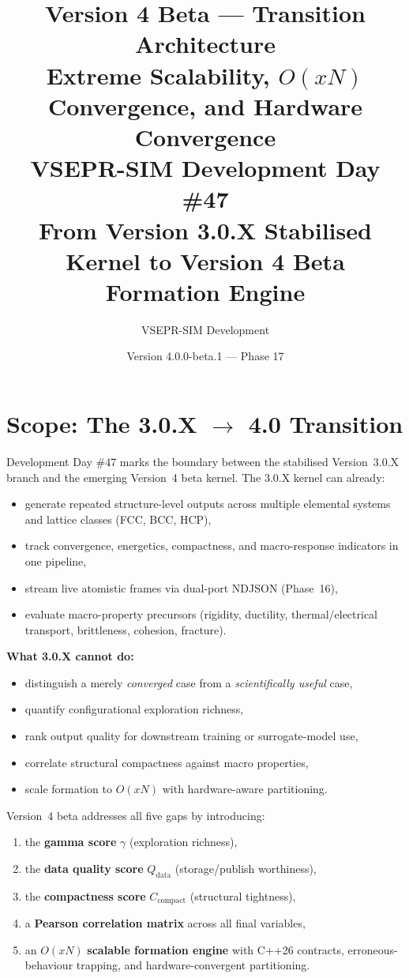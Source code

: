 \documentclass[11pt]{article}
\title{\textbf{Version 4 Beta --- Transition Architecture} \\[6pt]
\Large Extreme Scalability, $O(xN)$ Convergence, and Hardware Convergence \\[6pt]
\large VSEPR-SIM Development Day \#47 \\[4pt]
\normalsize From Version 3.0.X Stabilised Kernel to Version 4 Beta Formation Engine}
\author{VSEPR-SIM Development}
\date{Version 4.0.0-beta.1 --- Phase 17}
\newcommand{\var}[1]{\ensuremath{\mathrm{#1}}}
\begin{document}
\maketitle
\tableofcontents
\newpage

\section{Scope: The 3.0.X $\to$ 4.0 Transition}
\label{sec:scope}

Development Day \#47 marks the boundary between the stabilised Version~3.0.X
branch and the emerging Version~4 beta kernel.
The 3.0.X kernel can already:
\begin{itemize}[noitemsep]
  \item generate repeated structure-level outputs across multiple elemental
        systems and lattice classes (FCC, BCC, HCP),
  \item track convergence, energetics, compactness, and macro-response
        indicators in one pipeline,
  \item stream live atomistic frames via dual-port NDJSON (Phase~16),
  \item evaluate macro-property precursors (rigidity, ductility,
        thermal/electrical transport, brittleness, cohesion, fracture).
\end{itemize}

\noindent
\textbf{What 3.0.X cannot do:}
\begin{itemize}[noitemsep]
  \item distinguish a merely \emph{converged} case from a
        \emph{scientifically useful} case,
  \item quantify configurational exploration richness,
  \item rank output quality for downstream training or surrogate-model use,
  \item correlate structural compactness against macro properties,
  \item scale formation to $O(xN)$ with hardware-aware partitioning.
\end{itemize}

Version~4 beta addresses all five gaps by introducing:
\begin{enumerate}[noitemsep]
  \item the \textbf{gamma score} $\gamma$ (exploration richness),
  \item the \textbf{data quality score} $Q_\var{data}$
        (storage/publish worthiness),
  \item the \textbf{compactness score} $C_\var{compact}$
        (structural tightness),
  \item a \textbf{Pearson correlation matrix} across all final variables,
  \item an $O(xN)$ \textbf{scalable formation engine} with C++26
        contracts, erroneous-behaviour trapping, and hardware-convergent
        partitioning.
\end{enumerate}
\end{document}
